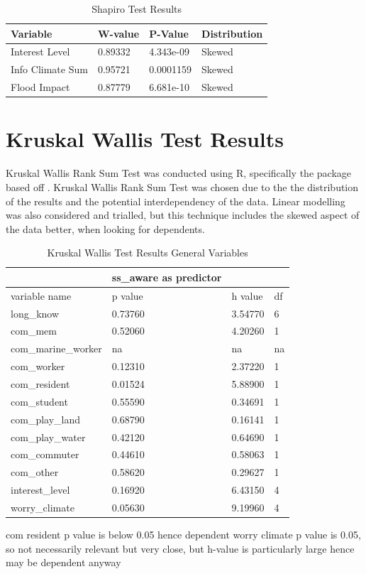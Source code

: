 \begin{table}[h]
    \centering
    \begin{tabular}{|l|l|l|l|}
    \hline
         Variable & W-value & P-Value & Distribution \\ \hline
       Interest Level & 0.89332 & 4.343e-09 & Skewed \\ \hline
         Info Climate Sum  & 0.95721 & 0.0001159 & Skewed \\ \hline
        Flood Impact & 0.87779 & 6.681e-10 & Skewed \\ \hline
     \end{tabular}
    \caption{Shapiro Test Results}
    \label{table:shapiro_test_results}
\end{table}

\section{Kruskal Wallis Test Results}
Kruskal Wallis Rank Sum Test was conducted using R, specifically the package based off \cite{hollander_nonparametric_2014}. Kruskal Wallis Rank Sum Test was chosen due to the the distribution of the results and the potential interdependency of the data. Linear modelling was also considered and trialled, but this technique includes the skewed aspect of the data better, when looking for dependents. 
\begin{table}[h]
    \centering
    \begin{tabular}{|l|l|l|l|}
    \hline
         ~ & ss\_aware as predictor & ~ & ~ \\ \hline
        variable name & p value & h value & df \\ \hline
           long\_know & 0.73760 & 3.54770 & 6 \\ \hline
        com\_mem & 0.52060 & 4.20260 & 1 \\ \hline
        com\_marine\_worker & na & na & na \\ \hline
        com\_worker & 0.12310 & 2.37220 & 1 \\ \hline
        com\_resident & 0.01524 & 5.88900 & 1 \\ \hline
        com\_student & 0.55590 & 0.34691 & 1 \\ \hline
        com\_play\_land & 0.68790 & 0.16141 & 1 \\ \hline
        com\_play\_water & 0.42120 & 0.64690 & 1 \\ \hline
        com\_commuter & 0.44610 & 0.58063 & 1 \\ \hline
        com\_other & 0.58620 & 0.29627 & 1 \\ \hline
        interest\_level & 0.16920 & 6.43150 & 4 \\ \hline
        worry\_climate & 0.05630 & 9.19960 & 4 \\ \hline
    \end{tabular}
    \caption{Kruskal Wallis Test Results General Variables}
    \label{Kruskal_wallis_test_general}
\end{table}
com resident p value is below 0.05 hence dependent
worry climate p value is 0.05, so not necessarily relevant but very close, but h-value is particularly large hence may be dependent anyway

